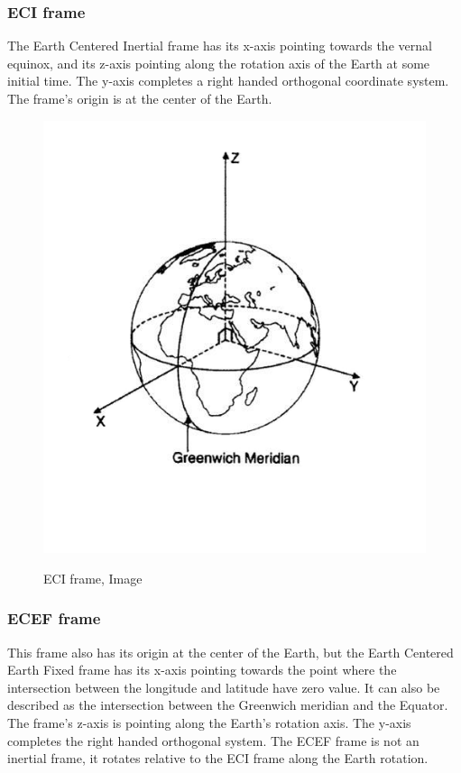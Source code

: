 \documentclass[12pt,a4paper,oneside]{article}
\begin{document}
\subsubsection{ECI frame}
The Earth Centered Inertial frame has its x-axis pointing towards the vernal equinox, and
its z-axis pointing along the rotation axis of the Earth at some initial time. The y-axis
completes a right handed orthogonal coordinate system. The frame’s origin is at the center
of the Earth.
\cite{larson1992space}
\begin{figure}[h]
\includegraphics[scale=0.4]{eci_frame.jpg}
\centering
\label{fig:eci_frame}
\caption{ECI frame, Image \cite{larson1992space}}
\end{figure}
\subsubsection{ECEF frame}
This frame also has its origin at the center of the Earth, but the Earth Centered Earth
Fixed frame has its x-axis pointing towards the point where the intersection between the
longitude and latitude have zero value. It can also be described as the intersection between
the Greenwich meridian and the Equator. The frame’s z-axis is pointing along the Earth’s
rotation axis. The y-axis completes the right handed orthogonal system. The ECEF frame
is not an inertial frame, it rotates relative to the ECI frame along the Earth rotation.
\end{document}
